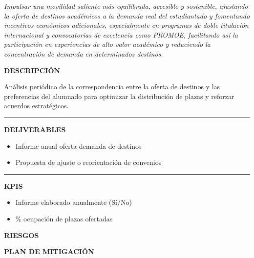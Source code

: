 \documentclass[11pt,a4paper]{scrreprt}
\newcommand{\fieldlabel}[1]{%
  {\footnotesize\sffamily\bfseries\color{mutedcolor}\MakeUppercase{#1}}\par\nopagebreak[4]
}
\newcommand{\fieldsep}{\vspace{3pt}\noindent\textcolor{bordercolor}{\rule{\linewidth}{0.4pt}}\vspace{3pt}\par}
\begin{document}
\newpage
{}
{\small\color{mutedcolor}\itshape Impulsar una movilidad saliente más equilibrada, accesible y sostenible, ajustando la oferta de destinos académicos a la demanda real del estudiantado y fomentando incentivos económicos adicionales, especialmente en programas de doble titulación internacional y convocatorias de excelencia como PROMOE, facilitando así la participación en experiencias de alto valor académico y reduciendo la concentración de demanda en determinados destinos. }\par\vspace{6pt}

\begin{tcolorbox}[pabox={fgcolor}{PA4.1 \enspace\textbullet\enspace Ajustar oferta y demanda entre destinos y preferencias del estudiantado}]

\fieldlabel{Descripci\'on}
{\small Análisis periódico de la correspondencia entre la oferta de destinos y las preferencias del alumnado para optimizar la distribución de plazas y reforzar acuerdos estratégicos.}\par
\fieldsep
\fieldlabel{Deliverables}
{\small \begin{itemize}[noitemsep,topsep=2pt]
\item Informe anual oferta-demanda de destinos
\item Propuesta de ajuste o reorientación de convenios
\end{itemize}}\par
\fieldsep
\fieldlabel{KPIs}
{\small \begin{itemize}[noitemsep,topsep=2pt]
\item Informe elaborado anualmente (Sí/No)
\item \% ocupación de plazas ofertadas
\end{itemize}}\par
\end{tcolorbox}
\begin{tcolorbox}[riskbox]
{\footnotesize\sffamily\bfseries\color{red!50!black} RIESGOS}\par{}
\end{tcolorbox}
\begin{tcolorbox}[mitbox]
{\footnotesize\sffamily\bfseries\color{green!40!black} PLAN DE MITIGACI\'ON}\par{}
\end{tcolorbox}
\vspace{8pt}
\end{document}
